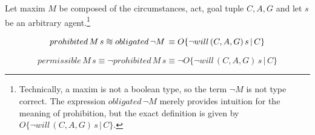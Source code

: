 \begin{isabellebody}
\begin{isamarkuptext}
\begin{definition} Let maxim $M$ be composed of the circumstances, act, 
goal tuple $C, A, G$ and let $s$ be an arbitrary agent.\footnote{Technically, a maxim is not a boolean 
type, so the term $\neg M$ is not type correct. The expression $obligated \, \neg M$ merely provides 
intuition for the meaning of prohibition, but the exact definition is given by 
$O\{ \neg will \, (C, A, G) \, s \, | \, C\}$.}

\newcommand*{\approxident}{%
  \mathrel{\vcenter{\offinterlineskip
  \hbox{$\sim$}\vskip-.35ex\hbox{$\sim$}\vskip-.35ex\hbox{$\sim$}}}}

$$ prohibited \, M \, s \approxident obligated \, \neg M \, \equiv O\{ \neg will \, (C, A, G) \, s \, | \, C\}$$

$$permissible \, M \, s \equiv \neg prohibited \, M \, s \equiv \neg O\{ \neg will \, (C, A, G) \, s \, | \, C\}$$

\end{definition} 


\end{isamarkuptext}
\end{isabellebody}
